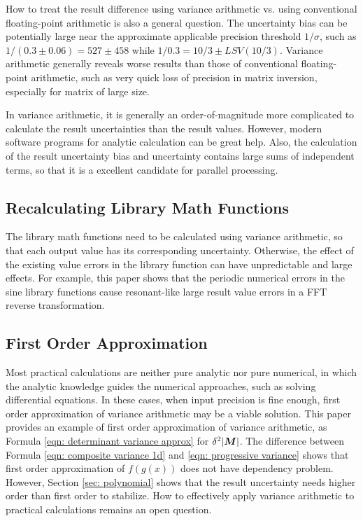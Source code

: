 \documentclass[twoside]{article}
\numberwithin{equation}{section}
\begin{document}
How to treat the result difference using variance arithmetic vs. using conventional floating-point arithmetic is also a general question.
The uncertainty bias can be potentially large near the approximate applicable precision threshold $1/\sigma$, such as $1/(0.3 \pm 0.06) = 527 \pm 458$ while $1/0.3 = 10/3 \pm LSV(10/3)$.  
Variance arithmetic generally reveals worse results than those of conventional floating-point arithmetic, such as very quick loss of precision in matrix inversion, especially for matrix of large size. 

In variance arithmetic, it is generally an order-of-magnitude more complicated to calculate the result uncertainties than the result values.
However, modern software programs for analytic calculation can be great help.
Also, the calculation of the result uncertainty bias and uncertainty contains large sums of independent terms, so that it is a excellent candidate for parallel processing.


\subsection{Recalculating Library Math Functions}

The library math functions need to be calculated using variance arithmetic, so that each output value has its corresponding uncertainty.
Otherwise, the effect of the existing value errors in the library function can have unpredictable and large effects.
For example, this paper shows that the periodic numerical errors in the sine library functions cause resonant-like large result value errors in a FFT reverse transformation.


\subsection{First Order Approximation}

Most practical calculations are neither pure analytic nor pure numerical, in which the analytic knowledge guides the numerical approaches, such as solving differential equations.
In these cases, when input precision is fine enough, first order approximation of variance arithmetic may be a viable solution.
This paper provides an example of first order approximation of variance arithmetic, as Formula \eqref{eqn: determinant variance approx} for $\delta^2 |\protect{\textrm{\boldmath $M$}}|$.
The difference between Formula \eqref{eqn: composite variance 1d} and \eqref{eqn: progressive variance} shows that first order approximation of $f(g(x))$ does not have dependency problem.
However, Section \ref{sec: polynomial} shows that the result uncertainty needs higher order than first order to stabilize.
How to effectively apply variance arithmetic to practical calculations remains an open question.
\end{document}
